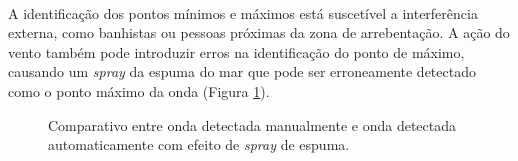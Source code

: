 \paragraph{}A identificação dos pontos mínimos e máximos está suscetível a interferência externa, como banhistas ou pessoas próximas da zona de arrebentação. A ação do vento \cite{Hwang2016} também pode introduzir erros na identificação do ponto de máximo, causando um \textit{spray} da espuma do mar que pode ser erroneamente detectado como o ponto máximo da onda (Figura \ref{FigMaxError}).

\begin{figure}[h]
	\centering

	\subfloat[]{\texttt{[image: ]}}

	\qquad

	\subfloat[]{\texttt{[image: ]}}

	\caption[\small{Comparativo entre onda detectada manualmente e onda detectada automaticamente com efeito de \textit{spray} de espuma.}]{\small{Comparativo entre onda detectada manualmente e onda detectada automaticamente com efeito de \textit{spray} de espuma.}}
	\label{FigMaxError}
\end{figure}